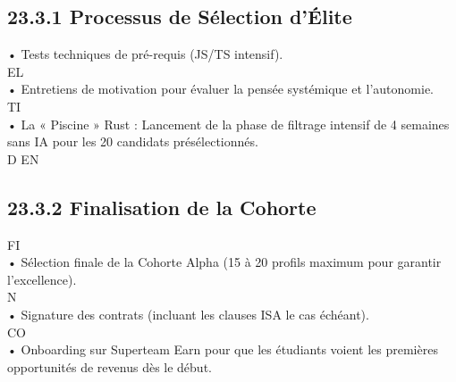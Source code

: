 \subsection{23.3.1 Processus de Sélection d’Élite}
• Tests techniques de pré-requis (JS/TS intensif).\\
\vspace{0.5em}
\vspace{0.5em}
\vspace{0.5em}
\vspace{0.5em}
EL\\
• Entretiens de motivation pour évaluer la pensée systémique et l’autonomie.\\
\vspace{0.5em}
\vspace{0.5em}
\vspace{0.5em}
\vspace{0.5em}
TI\\
• La « Piscine » Rust : Lancement de la phase de filtrage intensif de 4 semaines sans IA pour les 20 candidats présélectionnés.\\
\vspace{0.5em}
\vspace{0.5em}
\vspace{0.5em}
\vspace{0.5em}
D   EN\\
\subsection{23.3.2 Finalisation de la Cohorte}
\vspace{0.5em}
\vspace{0.5em}
\vspace{0.5em}
\vspace{0.5em}
FI\\
• Sélection finale de la Cohorte Alpha (15 à 20 profils maximum pour garantir l’excellence).\\
\vspace{0.5em}
N\\
• Signature des contrats (incluant les clauses ISA le cas échéant).\\
CO\\
• Onboarding sur Superteam Earn pour que les étudiants voient les premières opportunités de revenus dès le début.\\
\vspace{0.5em}
\vspace{0.5em}
